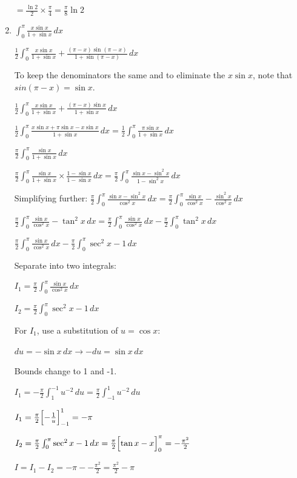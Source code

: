 \documentclass[../main.tex]{subfiles}
\begin{document}
\begin{enumerate}[itemsep=0.7cm]
    $=\frac{\ln{2}}{2} \times \frac{\pi}{4}=\frac{\pi}{8}\ln{2}$

    \item 
    $\int_0^{\pi} \frac{x\sin{x}}{1+\sin{x}}\,dx$

    $\frac{1}{2}\int_0^{\pi} \frac{x\sin{x}}{1+\sin{x}}+\frac{(\pi-x)\sin{(\pi-x)}}{1+\sin{(\pi-x)}}\,dx$

    To keep the denominators the same and to eliminate the $x\sin{x}$, note that $sin{(\pi-x)}=\sin{x}$.

    $\frac{1}{2}\int_0^{\pi} \frac{x\sin{x}}{1+\sin{x}}+\frac{(\pi-x)\sin{x}}{1+\sin{x}}\,dx$

    $\frac{1}{2}\int_0^{\pi} \frac{x\sin{x}+\pi\sin{x}-x\sin{x}}{1+\sin{x}}\,dx=\frac{1}{2}\int_0^{\pi} \frac{\pi\sin{x}}{1+\sin{x}}\,dx$

    $\frac{\pi}{2}\int_0^{\pi} \frac{\sin{x}}{1+\sin{x}}\,dx$

    $\frac{\pi}{2}\int_0^{\pi} \frac{\sin{x}}{1+\sin{x}}\times \frac{1-\sin{x}}{1-\sin{x}}\,dx=\frac{\pi}{2}\int_0^{\pi} \frac{\sin{x}-\sin^2{x}}{1-\sin^2{x}}\,dx$

    Simplifying further:
    $\frac{\pi}{2}\int_0^{\pi} \frac{\sin{x}-\sin^2{x}}{\cos^2{x}}\,dx=\frac{\pi}{2}\int_0^{\pi} \frac{\sin{x}}{\cos^2{x}}-\frac{\sin^2{x}}{\cos^2{x}}\,dx$

    $\frac{\pi}{2}\int_0^{\pi} \frac{\sin{x}}{\cos^2{x}}-\tan^2{x}\,dx=\frac{\pi}{2}\int_0^{\pi} \frac{\sin{x}}{\cos^2{x}}\,dx-\frac{\pi}{2}\int_0^{\pi}\tan^2{x}\,dx$

    $\frac{\pi}{2}\int_0^{\pi} \frac{\sin{x}}{\cos^2{x}}\,dx-\frac{\pi}{2}\int_0^{\pi}\sec^2{x}-1\,dx$

    Separate into two integrals:

    $I_1=\frac{\pi}{2}\int_0^{\pi} \frac{\sin{x}}{\cos^2{x}}\,dx$

    $I_2=\frac{\pi}{2}\int_0^{\pi}\sec^2{x}-1\,dx$

    For $I_1$, use a substitution of $u=\cos{x}$:

    $du=-\sin{x}\,dx \rightarrow -du=\sin{x}\,dx$

    Bounds change to 1 and -1.

    $I_1=-\frac{\pi}{2}\int_1^{-1}u^{-2}\,du=\frac{\pi}{2}\int_{-1}^1 u^{-2}\,du$

    $I_1=\frac{\pi}{2}\Bigl[-\frac{1}{u}\Bigr]_{-1}^1=-\pi$

    $I_2=\frac{\pi}{2}\int_0^{\pi}\sec^2{x}-1\,dx=\frac{\pi}{2}\Bigl[\tan{x}-x\Bigr]_0^{\pi}=-\frac{\pi^2}{2}$

    $I=I_1 - I_2 = -\pi - -\frac{\pi^2}{2}=\frac{\pi^2}{2}-\pi$

\end{enumerate}


\pagebreak
\end{document}

